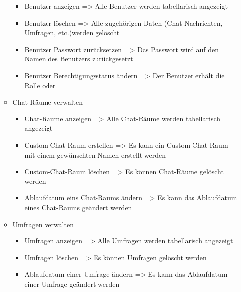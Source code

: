 \begin{itemize}
\begin{itemize}
      \begin{itemize}
        \item Benutzer anzeigen
        \newline
        => Alle Benutzer werden tabellarisch angezeigt
        \item Benutzer löschen
        \newline
        => Alle zugehörigen Daten (Chat Nachrichten, Umfragen, etc.)werden gelöscht
        \item Benutzer Passwort zurücksetzen
        \newline
        => Das Passwort wird auf den Namen des Benutzers zurückgesetzt
        \item Benutzer Berechtigungsstatus ändern
        \newline
        => Der Benutzer erhält die Rolle  oder 
      \end{itemize}
    \item Chat-Räume verwalten
      \begin{itemize}
        \item Chat-Räume anzeigen
        \newline
        => Alle Chat-Räume werden tabellarisch angezeigt
        \item Custom-Chat-Raum erstellen
        \newline
        => Es kann ein Custom-Chat-Raum mit einem gewünschten Namen erstellt werden
        \item Custom-Chat-Raum löschen
        \newline
        => Es können Chat-Räume gelöscht werden
        \item Ablaufdatum eins Chat-Raums ändern
        \newline
        => Es kann das Ablaufdatum eines Chat-Raums geändert werden
      \end{itemize}
    \item Umfragen verwalten
      \begin{itemize}
        \item Umfragen anzeigen
        \newline
        => Alle Umfragen werden tabellarisch angezeigt
        \item Umfragen löschen
        \newline
        => Es können Umfragen gelöscht werden
        \item Ablaufdatum einer Umfrage ändern
        \newline
        => Es kann das Ablaufdatum einer Umfrage geändert werden

\end{itemize}
\end{itemize}
\end{itemize}
